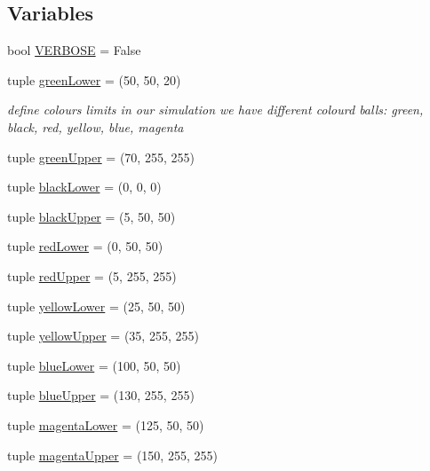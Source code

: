 \subsection*{Variables}
\begin{DoxyCompactItemize}
\item 
bool \hyperlink{namespaceopencv__tracking_ad3cc02ced91fdb8fd9b8fb0a89e7c297}{V\+E\+R\+B\+O\+SE} = False
\item 
tuple \hyperlink{namespaceopencv__tracking_ae20aa72a19e6e14042aba5f513e47666}{green\+Lower} = (50, 50, 20)
\begin{DoxyCompactList}\small\item\em define colours limits in our simulation we have different colourd balls\+: green, black, red, yellow, blue, magenta \end{DoxyCompactList}\item 
tuple \hyperlink{namespaceopencv__tracking_a1532ff08278ac73ec997a3fe7e722ae2}{green\+Upper} = (70, 255, 255)
\item 
tuple \hyperlink{namespaceopencv__tracking_aa42c654a203c0ec6e10f27338993fce5}{black\+Lower} = (0, 0, 0)
\item 
tuple \hyperlink{namespaceopencv__tracking_a9c05fe9d080a22ff54e74421135adb66}{black\+Upper} = (5, 50, 50)
\item 
tuple \hyperlink{namespaceopencv__tracking_ac22f88a13916e9e3e465f236def40bf7}{red\+Lower} = (0, 50, 50)
\item 
tuple \hyperlink{namespaceopencv__tracking_a769683f711610a1e04e80b23d9efcd74}{red\+Upper} = (5, 255, 255)
\item 
tuple \hyperlink{namespaceopencv__tracking_a4dd8f7ca43b20a85ab5c1638dd8320c9}{yellow\+Lower} = (25, 50, 50)
\item 
tuple \hyperlink{namespaceopencv__tracking_a419b084fb02ba60c1b703e8dd27ca49b}{yellow\+Upper} = (35, 255, 255)
\item 
tuple \hyperlink{namespaceopencv__tracking_a16ee8fd0722f3e51be2902412cd3a648}{blue\+Lower} = (100, 50, 50)
\item 
tuple \hyperlink{namespaceopencv__tracking_af6a8c3b7fb8173f13e8f7752d8b1aac1}{blue\+Upper} = (130, 255, 255)
\item 
tuple \hyperlink{namespaceopencv__tracking_a5bd467d28a31cea56ffa1b3bbc47940e}{magenta\+Lower} = (125, 50, 50)
\item 
tuple \hyperlink{namespaceopencv__tracking_ad4cd08d48dd951c3f91e5560c51ab1ad}{magenta\+Upper} = (150, 255, 255)
\end{DoxyCompactItemize}


